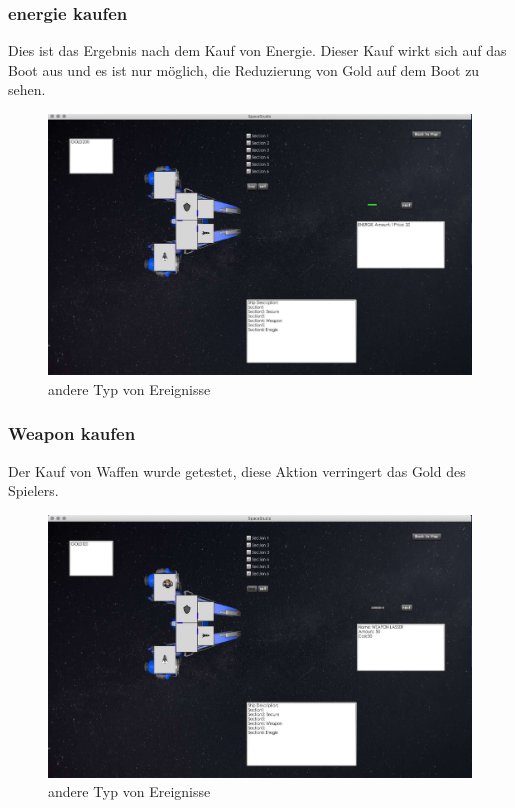 \documentclass[12pt]{article}
\begin{document}
\subsubsection{energie kaufen}
Dies ist das Ergebnis nach dem Kauf von Energie. Dieser Kauf wirkt sich auf das Boot aus und es ist nur möglich, die Reduzierung von Gold auf dem Boot zu sehen.
\begin{figure}[htp]
\centering
\includegraphics[scale=0.4]{TestProtocolBilder/energie.jpg}
\caption{andere Typ von Ereignisse}
\end{figure}
\newpage
\subsubsection{Weapon kaufen}
Der Kauf von Waffen wurde getestet, diese Aktion verringert das Gold des Spielers.    
\begin{figure}[htp]
\centering
\includegraphics[scale=0.4]{TestProtocolBilder/weaponkaufen.jpg}
\caption{andere Typ von Ereignisse}
\end{figure}
\newpage
\end{document}
